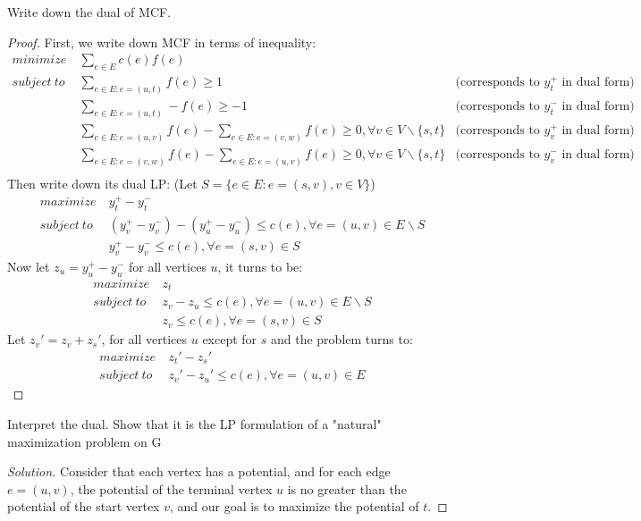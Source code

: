

    \begin{thm}{}{}
        Write down the dual of MCF. 
    \end{thm}

    \begin{proof}
        First, we write down MCF in terms of inequality: 
        \begin{align*}
            minimize\ &\sum_{e\in E}c(e)f(e)\\
            subject\ to\ &\sum_{e\in E:e=(u,t)}f(e)\geq 1 & \text{(corresponds to $y_t^+$ in dual form)}\\
                &\sum_{e\in E:e=(u,t)}-f(e)\geq -1 & \text{(corresponds to $y_t^-$ in dual form)}\\
                &\sum_{e\in E:e=(u,v)}f(e)-\sum_{e\in E:e=(v,w)}f(e)\geq 0,\forall v\in V\backslash\{s,t\} & \text{(corresponds to $y_v^+$ in dual form)}\\
                &\sum_{e\in E:e=(v,w)}f(e)-\sum_{e\in E:e=(u,v)}f(e)\geq 0,\forall v\in V\backslash\{s,t\} & \text{(corresponds to $y_v^-$ in dual form)}\\
        \end{align*}
        Then write down its dual LP: (Let $S=\{e\in E:e=(s,v),v\in V\}$)
        \begin{align*}
            maximize\ &y_t^+-y_t^-\\
            subject\ to\ &(y_v^+-y_v^-)-(y_u^+-y_u^-)\leq c(e),\forall e=(u,v)\in E\backslash S\\
                        &y_v^+-y_v^-\leq c(e),\forall e=(s,v)\in S
        \end{align*}
        Now let $z_u=y_u^+-y_u^-$ for all vertices $u$, it turns to be: 
        \begin{align*}
            maximize\ &z_t\\
            subject\ to\ &z_v-z_u\leq c(e),\forall e=(u,v)\in E\backslash S\\
                        &z_v\leq c(e),\forall e=(s,v)\in S
        \end{align*}
        Let $z_v'=z_v+z_s'$, for all vertices $u$ except for $s$ and the problem turns to: 
        \begin{align*}
            maximize\ &z_t'-z_s'\\
            subject\ to\ &z_v'-z_u'\leq c(e),\forall e=(u,v)\in E
        \end{align*}
    \end{proof}

    \begin{thm}{}{}
        Interpret the dual. Show that it is the LP formulation of a "natural" maximization problem on G
    \end{thm}

    \begin{proof}[Solution]
        Consider that each vertex has a potential, and for each edge $e=(u,v)$, 
        the potential of the terminal vertex $u$ is no greater than the potential of the start vertex $v$, 
        and our goal is to maximize the potential of $t$. 
    \end{proof}
